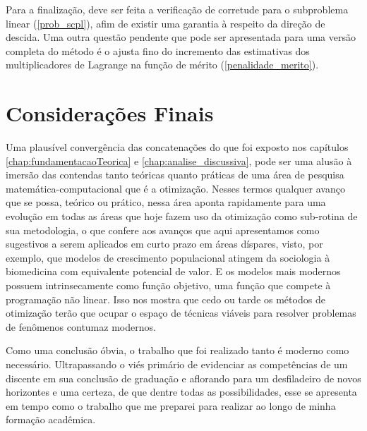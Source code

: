 Para a finalização, deve ser feita a verificação de corretude para o subproblema
linear (\ref{prob_scpl}), afim de existir uma garantia à respeito da direção de
descida. Uma outra questão pendente que pode ser apresentada para uma versão completa
do método é o ajusta fino do incremento das estimativas dos multiplicadores de
Lagrange na função de mérito (\ref{penalidade_merito}).

\section{Considerações Finais}
\label{sec:consideracoesFinais}

\noindent
Uma plausível convergência das concatenações do que foi exposto nos capítulos
\ref{chap:fundamentacaoTeorica} e \ref{chap:analise_discussiva}, pode ser uma
alusão à imersão das contendas tanto teóricas quanto práticas de uma área de
pesquisa matemática-computacional que é a otimização. Nesses termos qualquer
avanço que se possa, teórico ou prático, nessa área aponta rapidamente para
uma evolução em todas as áreas que hoje fazem uso da otimização como
sub-rotina de sua metodologia, o que confere aos avanços que aqui apresentamos
como sugestivos a serem aplicados em curto prazo em áreas díspares, visto, por
exemplo, que modelos de crescimento populacional atingem da sociologia à
biomedicina com equivalente potencial de valor. E os modelos mais modernos
possuem intrinsecamente como função objetivo, uma função que compete à
programação não linear. Isso nos mostra que cedo ou tarde os métodos de
otimização terão que ocupar o espaço de técnicas viáveis para resolver
problemas de fenômenos contumaz modernos.

Como uma conclusão óbvia, o trabalho que foi realizado tanto é moderno como
necessário. Ultrapassando o viés primário de evidenciar as competências de um
discente em sua conclusão de graduação e aflorando para um desfiladeiro de
novos horizontes e uma certeza, de que dentre todas as possibilidades, esse se
apresenta em tempo como o trabalho que me preparei para realizar ao longo de
minha formação acadêmica.
